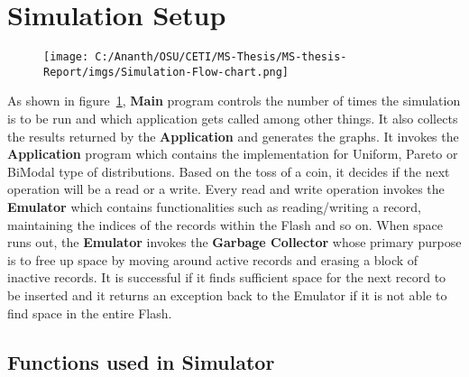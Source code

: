 \section{Simulation Setup}

\begin{figure}[H]
	\centering
	\texttt{[image: C:/Ananth/OSU/CETI/MS-Thesis/MS-thesis-Report/imgs/Simulation-Flow-chart.png]}
	 \label{Simulator-FlowChart}
\end{figure}

As shown in figure~\ref{Simulator-FlowChart}, {\bf Main} program controls the number of times the simulation is to be run and which application gets called among other things. It also collects the results returned by the {\bf Application} and generates the graphs. It invokes the {\bf Application} program which contains the implementation for Uniform, Pareto or BiModal type of distributions. Based on the toss of a coin, it decides if the next operation will be a read or a write. Every read and write operation invokes the {\bf Emulator} which contains functionalities such as reading/writing a record, maintaining the indices of the records within the Flash and so on. When space runs out, the {\bf Emulator} invokes the {\bf Garbage Collector} whose primary purpose is to free up space by moving around active records and erasing a block of inactive records. It is successful if it finds sufficient space for the next record to be inserted and it returns an exception back to the Emulator if it is not able to find space in the entire Flash.


\subsection{Functions used in Simulator}


